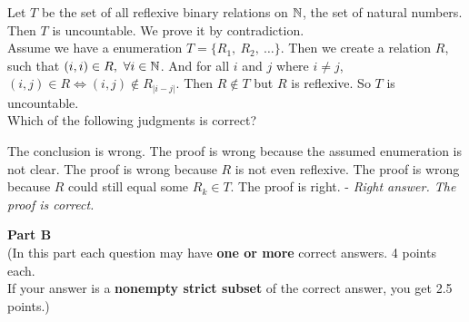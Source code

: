 \begin{questions}
\vspace{1.8in}


\question Let $T$ be the set of all reflexive binary relations on ${\mathbb N}{}$, the set of natural numbers. Then $T$ is uncountable. We prove it by contradiction.\\

Assume we have a enumeration $T = \{R_1,\ R_2,\ \dots\}$. Then we create a relation $R$, such that $(i,i)\in R,\ \forall i\in {\mathbb N}{}$. And for all $i$ and $j$ where $i\neq j$, $(i,j)\in R \iff (i,j)\not\in R_{\lvert i-j \rvert}$. Then $R\not\in T$ but $R$ is reflexive. So $T$ is uncountable.\\

Which of the following judgments is correct?
\begin{choices}
\choice The conclusion is wrong.
\choice The proof is wrong because the assumed enumeration is not clear.
\choice The proof is wrong because $R$ is not even reflexive.
\choice The proof is wrong because $R$ could still equal some $R_k\in T$.
\choice The proof is right. - \textit{Right answer. The proof is correct.}
\end{choices}

\end{questions}

\newpage

\begin{center}
{\bf Part B}\\
\medskip
(In this part each question may have {\bf one or more} correct answers. 4 points each.\\ If your answer is a {\bf nonempty strict subset} of the correct answer, you get 2.5 points.)
\end{center}
\bigskip

